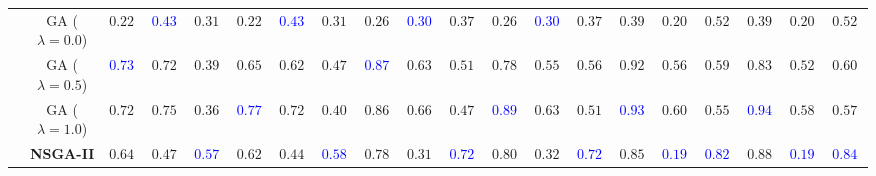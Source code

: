 \begin{table}[t]
{\begin{tabular}{cc|cccccc|cccccc|cccccc}
& GA ($\lambda=0.0$)
& $0.2200$ & \textbf{\textcolor{blue}{$0.4351$}} & $0.3167$ & $0.2200$ & \textbf{\textcolor{blue}{$0.4351$}} & $0.3167$ & $0.2600$ & \textbf{\textcolor{blue}{$0.3032$}} & $0.3787$ & $0.2600$ & \textbf{\textcolor{blue}{$0.3032$}} & $0.3787$ & $0.3900$ & $0.2057$ & $0.5231$ & $0.3900$ & $0.2057$ & $0.5231$ \\
& GA ($\lambda=0.5$)
& \textbf{\textcolor{blue}{$0.7300$}} & $0.7253$ & $0.3992$ & $0.6500$ & $0.6241$ & $0.4763$ & \textbf{\textcolor{blue}{$0.8700$}} & $0.6347$ & $0.5145$ & $0.7800$ & $0.5521$ & $0.5691$ & $0.9200$ & $0.5628$ & $0.5927$ & $0.8300$ & $0.5288$ & $0.6012$ \\
& GA ($\lambda=1.0$)
& $0.7200$ & $0.7571$ & $0.3633$ & \textbf{\textcolor{blue}{$0.7700$}} & $0.7221$ & $0.4084$ & $0.8600$ & $0.6697$ & $0.4773$ & \textbf{\textcolor{blue}{$0.8900$}} & $0.6342$ & $0.5185$ & \textbf{\textcolor{blue}{$0.9300$}} & $0.6057$ & $0.5538$ & \textbf{\textcolor{blue}{$0.9400$}} & $0.5859$ & $0.5749$ \\
& \textbf{NSGA-II}
& $0.6400$ & $0.4757$ & \textbf{\textcolor{blue}{$0.5764$}} & $0.6200$ & $0.4481$ & \textbf{\textcolor{blue}{$0.5840$}} & $0.7800$ & $0.3141$ & \textbf{\textcolor{blue}{$0.7299$}} & $0.8000$ & $0.3293$ & \textbf{\textcolor{blue}{$0.7296$}} & $0.8500$ & \textbf{\textcolor{blue}{$0.1926$}} & \textbf{\textcolor{blue}{$0.8281$}} & $0.8800$ & \textbf{\textcolor{blue}{$0.1940$}} & \textbf{\textcolor{blue}{$0.8414$}} \\

\bottomrule
\end{tabular}
}
\end{table}


\clearpage

